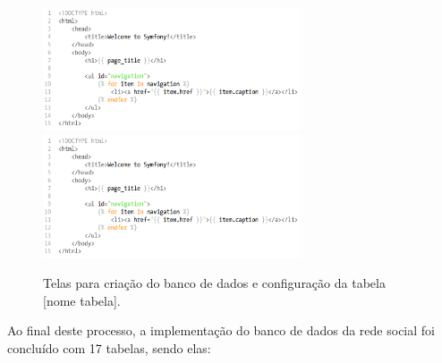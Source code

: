 \documentclass[cic,tc]{iiufrgs}
\begin{document}
\begin{figure}[h]
    \begin{adjustwidth}{-1in}{-.8in}
        \includegraphics[width=0.68\textwidth]{figuras/twig-symf.png}
        \includegraphics[width=0.68\textwidth]{figuras/twig-symf.png}
        \caption{Telas para criação do banco de dados e configuração da tabela [nome tabela].}
        \label{projetoImagens}
    \end{adjustwidth}
\end{figure}

Ao final deste processo, a implementação do banco de dados da rede social foi concluído com 17 tabelas, sendo elas:
\end{document}

